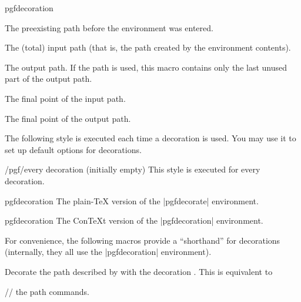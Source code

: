 \begin{environment}{{pgfdecoration}}
  \begin{command}{\pgfdecorateexistingpath}
    The preexisting path before the environment was entered.
  \end{command}
	
  \begin{command}{\pgfdecoratedpath}
    The (total) input path (that is, the path created by the environment contents).
  \end{command}
	
  \begin{command}{\pgfdecorationpath}
    The output path. If the path is used, this macro contains only the
    last unused part of the output path.
  \end{command}
	
  \begin{command}{\pgfpointdecoratedpathlast}
    The final point of the input path.
  \end{command}

  \begin{command}{\pgfpointdecorationpathlast}
    The final point of the output path.
  \end{command}

  The following style is executed each time a decoration is used. You
  may use it to set up default options for decorations.
  \begin{stylekey}{/pgf/every decoration (initially \normalfont empty)}
    This style is executed for every decoration.
  \end{stylekey}
\end{environment}

\begin{plainenvironment}{{pgfdecoration}}
  The plain-\TeX{} version of the |{pgfdecorate}| environment.      %
\end{plainenvironment}

\begin{contextenvironment}{{pgfdecoration}}
  The Con\TeX t version of the |{pgfdecoration}| environment.
\end{contextenvironment}

For convenience, the following macros provide a ``shorthand''
for decorations (internally, they all use the |{pgfdecoration}|
environment).

\begin{command}{\pgfdecoratepath{}}
  Decorate the path described by  with the
  decoration . This is equivalent to
\begin{codeexample}
  // the path commands.
\endpgfdecorate
\end{codeexample}
\end{command}

